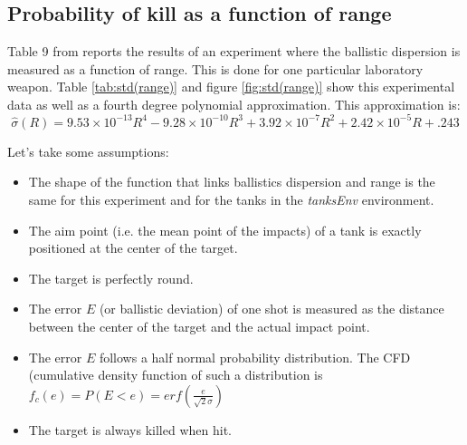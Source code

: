 \chapter{}

\section{Probability of kill as a function of range}\label{ann:pkill}

Table 9 from \cite{abal} reports the results of an experiment where the ballistic dispersion is measured as a function of range. This is done for one particular laboratory weapon. Table \ref{tab:std(range)} and figure \ref{fig:std(range)} show this experimental data as well as a fourth degree polynomial approximation. This approximation is:\\

\begin{equation} \label{eq:approx std(R)}
    \hat{\sigma}(R) = 9.53\times10^{-13}R^4 - 9.28\times10^{-10}R^3 + 3.92\times10^{-7}R^2 + 2.42\times10^{-5}R + .243
\end{equation}\hfill\break

Let's take some assumptions:

\begin{itemize}
    \item The shape of the function that links ballistics dispersion and range is the same for this experiment and for the tanks in the \textit{tanksEnv} environment.
    \item The aim point (i.e. the mean point of the impacts) of a tank is exactly positioned at the center of the target.
    \item The target is perfectly round.
    \item The error $E$ (or ballistic deviation) of one shot is measured as the distance between the center of the target and the actual impact point.
    \item The error $E$ follows a half normal probability distribution. The CFD (cumulative density function of such a distribution is $f_c(e) = P(E<e)=erf\left( \frac{e}{\sqrt{2}\sigma}\right)$ 
    \item The target is always killed when hit.
\end{itemize}

